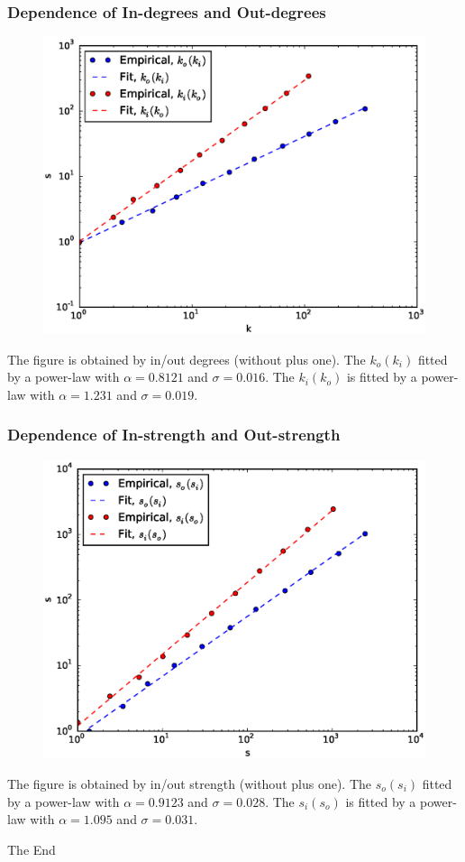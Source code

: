 \documentclass{beamer}
\begin{document}
\begin{frame}
\frametitle{Dependence of In-degrees and Out-degrees}
\begin{figure}
\includegraphics[width=0.65\linewidth]{dd.eps}
\end{figure}
\small{The figure is obtained by in/out degrees (without plus one). The $k_o(k_i)$ fitted by a power-law with $\alpha=0.8121$ and $\sigma=0.016$. The $k_i(k_o)$ is fitted by a power-law with $\alpha=1.231$ and $\sigma=0.019$.}
\end{frame}


\begin{frame}
\frametitle{Dependence of In-strength and Out-strength}
\begin{figure}
\includegraphics[width=0.65\linewidth]{ss.eps}
\end{figure}
\small{The figure is obtained by in/out strength (without plus one). The $s_o(s_i)$ fitted by a power-law with $\alpha=0.9123$ and $\sigma=0.028$. The $s_i(s_o)$ is fitted by a power-law with $\alpha=1.095$ and $\sigma=0.031$.}
\end{frame}


\begin{frame}
\Huge{\centerline{The End}}
\end{frame}

\end{document}
